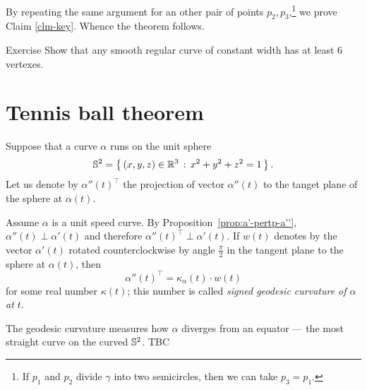 By repeating the same argument for an other pair of points $p_2,p_3$,\footnote{If $p_1$ and $p_2$ divide $\gamma$ into two semicircles, then we can take $p_3=p_1$.} 
we prove Claim \ref{clm-key}.
Whence the theorem follows.
\qeds

\begin{thm}{Exercise}
Show that any smooth regular curve of constant width has at least 6 vertexes.
\end{thm}

\section{Tennis ball theorem}

Suppose that a curve $\alpha$ runs on the unit sphere 
\[\mathbb{S}^2=\left\{\,{(x,y,z)\in\mathbb{R}^3}\,:\,{x^2+y^2+z^2=1}\,\right\}.\] 
Let us denote by $\alpha''(t)^\top$ the projection of vector $\alpha''(t)$ to the tanget plane of the sphere at $\alpha(t)$.

Assume $\alpha$ is a unit speed curve.
By Proposition~\ref{prop:a'-pertp-a''}, $\alpha''(t)\perp\alpha'(t)$ and therefore $\alpha''(t)^\top\perp\alpha'(t)$.
If $w(t)$ denotes by the vector $\alpha'(t)$ rotated
counterclockwise by angle $\tfrac\pi2$ in the tangent plane to the sphere at $\alpha(t)$, then 
\[\alpha''(t)^\top=\kappa_\alpha(t)\cdot w(t)\]
for some real number $\kappa(t)$;
this number is called \emph{signed geodesic curvature of $\alpha$ at $t$}.

The geodesic curvature measures how $\alpha$ diverges from an equator --- the most straight curve on the curved $\mathbb{S}^2$.
TBC
